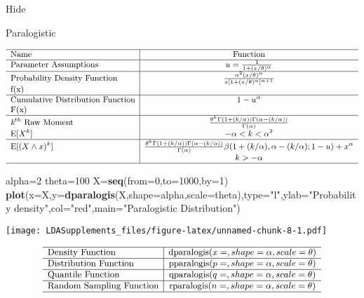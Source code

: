 \documentclass[]{book}
\newenvironment{Shaded}{\begin{snugshade}}{\end{snugshade}}
\newcommand{\KeywordTok}[1]{\textcolor[rgb]{0.13,0.29,0.53}{\textbf{#1}}}
\newcommand{\DataTypeTok}[1]{\textcolor[rgb]{0.13,0.29,0.53}{#1}}
\newcommand{\DecValTok}[1]{\textcolor[rgb]{0.00,0.00,0.81}{#1}}
\newcommand{\StringTok}[1]{\textcolor[rgb]{0.31,0.60,0.02}{#1}}
\newcommand{\NormalTok}[1]{#1}
\begin{document}
\hypertarget{2pD}{}
{Hide}

Paralogistic

\[
{\small
\begin{matrix}
\begin{array}{l|c}
\hline
  \text{Name} & \text{Function} \\
\hline
  \text{Parameter Assumptions} & u=\frac{1}{1+(x/\theta)^\alpha} \\
\hline
  \text{Probability Density Function} & \frac{\alpha^2(x/\theta)^\alpha}{x[1+(x/\theta)^\alpha]^{\alpha+1}} \\
    \text{f(x)} & \\
\hline
  \text{Cumulative Distribution Function} & 1-u^\alpha \\
    \text{F(x)} & \\
\hline
  \textit{k}^{th}~\text{Raw Moment} & \frac{\theta^k\Gamma(1+(k/\alpha))\Gamma(\alpha-(k/\alpha))}{\Gamma(\alpha)} \\
  \mathrm{E}[X^k]  & -\alpha<k<\alpha^2 \\
\hline
  \mathrm{E}[(X\wedge x)^k] & \frac{\theta^k\Gamma(1+(k/\alpha))\Gamma(\alpha-(k/\alpha))}{\Gamma(\alpha)}\beta(1+(k/\alpha),\alpha-(k/\alpha);1-u)+x^\alpha \\
  & k>-\alpha \\
\hline
\end{array}
\end{matrix}
}
\]

\begin{Shaded}
\begin{Highlighting}[]
\NormalTok{alpha=}\DecValTok{2}
\NormalTok{theta=}\DecValTok{100}
\NormalTok{X=}\KeywordTok{seq}\NormalTok{(}\DataTypeTok{from=}\DecValTok{0}\NormalTok{,}\DataTypeTok{to=}\DecValTok{1000}\NormalTok{,}\DataTypeTok{by=}\DecValTok{1}\NormalTok{)}
\KeywordTok{plot}\NormalTok{(}\DataTypeTok{x=}\NormalTok{X,}\DataTypeTok{y=}\KeywordTok{dparalogis}\NormalTok{(X,}\DataTypeTok{shape=}\NormalTok{alpha,}\DataTypeTok{scale=}\NormalTok{theta),}\DataTypeTok{type=}\StringTok{"l"}\NormalTok{,}\DataTypeTok{ylab=}\StringTok{"Probability density"}\NormalTok{,}\DataTypeTok{col=}\StringTok{"red"}\NormalTok{,}\DataTypeTok{main=}\StringTok{"Paralogistic Distribution"}\NormalTok{)}
\end{Highlighting}
\end{Shaded}

\texttt{[image: LDASupplements\_files/figure-latex/unnamed-chunk-8-1.pdf]}

\[
{\small
\begin{matrix}
\begin{array}{l|c}
\hline
  \text{Density Function} & \text{dparalogis}(x=, shape=\alpha, scale=\theta) \\
\hline
  \text{Distribution Function} & \text{pparalogis}(p=, shape=\alpha,scale=\theta) \\
\hline
  \text{Quantile Function} & \text{qparalogis}(q=, shape=\alpha,scale=\theta) \\ 
\hline
  \text{Random Sampling Function} & \text{rparalogis}(n=, shape=\alpha,scale=\theta) \\
\hline
\end{array}
\end{matrix}
}
\]
\end{document}
